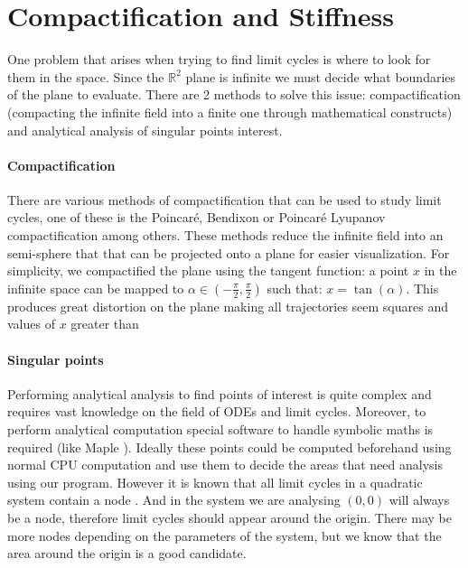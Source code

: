 
\section{Compactification and Stiffness}%
\label{sec:compact-stiff}

One problem that arises when trying to find limit cycles is where to look for
them in the space. Since the $\mathbb{R}^2$ plane is infinite we must decide
what boundaries of the plane to evaluate. There are 2 methods to solve this
issue: compactification (compacting the infinite field into a finite one through
mathematical constructs) and analytical analysis of singular points interest.

\paragraph{Compactification}
There are various methods of compactification that can be used to study
limit cycles, one of these is the Poincaré, Bendixon or
Poincaré Lyupanov compactification
\cite{poincare_sur_1891,bendixson_sur_1901,dumortier_poincare_2006,noauthor_fig_nodate}
among others.  These methods reduce the infinite field into an semi-sphere that
that can be projected onto a plane for easier visualization. For simplicity, we
compactified the plane using the tangent function: a point $x$ in the infinite
space can be mapped to $\alpha \in \left(-\frac{\pi}{2}, \frac{\pi}{2}\right)$
such that: $x = \tan(\alpha)$. This produces great distortion on the plane
making all trajectories seem squares and values of $x$ greater than

\paragraph{Singular points}
Performing analytical analysis to find points of interest is quite complex and
requires vast knowledge on the field of ODEs and limit cycles. Moreover, to
perform analytical computation special software to handle symbolic maths is
required (like Maple \cite{noauthor_maple_nodate}). Ideally these points could
be computed beforehand using normal CPU computation and use them to decide the
areas that need analysis using our program. However it is known that all limit
cycles in a quadratic system contain a node \cite{cherkas_quadratic_2003}. And
in the system we are analysing $(0,0)$ will always be a node, therefore limit
cycles should appear around the origin. There may be more nodes
depending on the parameters of the system, but we know that the area around the
origin is a good candidate.

